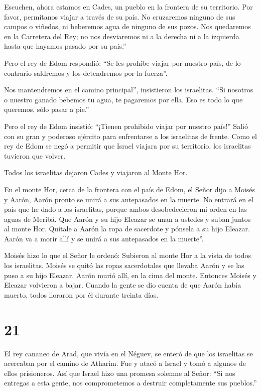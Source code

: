 Escuchen, ahora estamos en Cades, un pueblo en la frontera de su
territorio.  Por favor, permítanos viajar a través de su
país. No cruzaremos ninguno de sus campos o viñedos, ni beberemos agua
de ninguno de sus pozos. Nos quedaremos en la Carretera del Rey; no nos
desviaremos ni a la derecha ni a la izquierda hasta que hayamos pasado
por su país.''

 Pero el rey de Edom respondió: ``Se les prohíbe viajar por
nuestro país, de lo contrario saldremos y los detendremos por la
fuerza''.

 Nos mantendremos en el camino principal'', insistieron los
israelitas. ``Si nosotros o nuestro ganado bebemos tu agua, te pagaremos
por ella. Eso es todo lo que queremos, sólo pasar a pie.''

 Pero el rey de Edom insistió: ``¡Tienen prohibido viajar
por nuestro país!'' Salió con su gran y poderoso ejército para
enfrentarse a los israelitas de frente.  Como el rey de
Edom se negó a permitir que Israel viajara por su territorio, los
israelitas tuvieron que volver.

 Todos los israelitas dejaron Cades y viajaron al Monte
Hor.

 En el monte Hor, cerca de la frontera con el país de Edom,
el Señor dijo a Moisés y Aarón,  Aarón pronto se unirá a
sus antepasados en la muerte. No entrará en el país que he dado a los
israelitas, porque ambos desobedecieron mi orden en las aguas de Meribá.
 Que Aarón y su hijo Eleazar se unan a ustedes y suban
juntos al monte Hor.  Quítale a Aarón la ropa de sacerdote
y pónsela a su hijo Eleazar. Aarón va a morir allí y se unirá a sus
antepasados en la muerte''.

 Moisés hizo lo que el Señor le ordenó: Subieron al monte
Hor a la vista de todos los israelitas.  Moisés se quitó
las ropas sacerdotales que llevaba Aarón y se las puso a su hijo
Eleazar. Aarón murió allí, en la cima del monte. Entonces Moisés y
Eleazar volvieron a bajar.  Cuando la gente se dio cuenta
de que Aarón había muerto, todos lloraron por él durante treinta días.

\hypertarget{section-20}{%
\section{21}\label{section-20}}

 El rey cananeo de Arad, que vivía en el Néguev, se enteró
de que los israelitas se acercaban por el camino de Atharim. Fue y atacó
a Israel y tomó a algunos de ellos prisioneros.  Así que
Israel hizo una promesa solemne al Señor: ``Si nos entregas a esta
gente, nos comprometemos a destruir completamente sus pueblos.''

